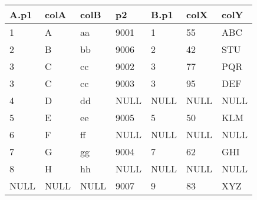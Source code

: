 \documentclass[10pt, a4paper, ngerman]{arbeitsblatt}
\begin{document}
\begin{aufgabe}
\begin{tabular}{*{7}{l}}\hline
	\rowcolor{ab.tabelle.kopf.hg}
	A.p1 & colA & colB & p2 & B.p1 & colX & colY      \\
	\hline\midrule
	1 & A & aa & 9001 & 1 & 55 & ABC \\\hline
	2 & B & bb & 9006 & 2 & 42 & STU \\\hline
	3 & C & cc & 9002 & 3 & 77 & PQR \\\hline
	3 & C & cc & 9003 & 3 & 95 & DEF \\\hline
	4 & D & dd & NULL & NULL & NULL & NULL\\\hline
	5 & E & ee & 9005 & 5 & 50 & KLM \\\hline
	6 & F & ff & NULL & NULL & NULL & NULL \\\hline
	7 & G & gg & 9004 & 7 & 62 & GHI \\\hline
	8 & H & hh & NULL & NULL & NULL & NULL \\\hline
	NULL & NULL & NULL & 9007 & 9 & 83 & XYZ \\\hline
\end{tabular}
\end{aufgabe}
\end{document}
